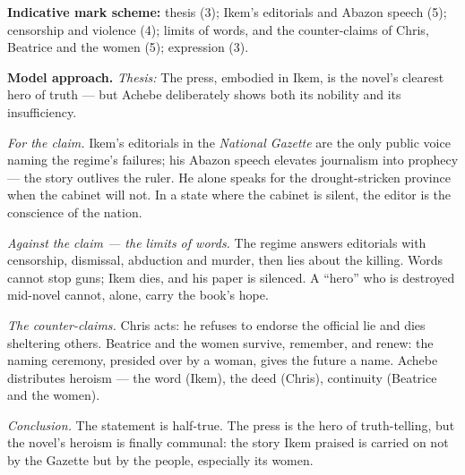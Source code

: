 \documentclass[11pt]{article}
\begin{document}
\begin{corrige}
\textbf{Indicative mark scheme:} thesis (3); Ikem's editorials and Abazon speech (5); censorship and violence (4); limits of words, and the counter-claims of Chris, Beatrice and the women (5); expression (3).

\textbf{Model approach.}
\emph{Thesis:} The press, embodied in Ikem, is the novel's clearest hero of truth --- but Achebe deliberately shows both its nobility and its insufficiency.

\emph{For the claim.} Ikem's editorials in the \emph{National Gazette} are the only public voice naming the regime's failures; his Abazon speech elevates journalism into prophecy --- the story outlives the ruler. He alone speaks for the drought-stricken province when the cabinet will not. In a state where the cabinet is silent, the editor is the conscience of the nation.

\emph{Against the claim --- the limits of words.} The regime answers editorials with censorship, dismissal, abduction and murder, then lies about the killing. Words cannot stop guns; Ikem dies, and his paper is silenced. A ``hero'' who is destroyed mid-novel cannot, alone, carry the book's hope.

\emph{The counter-claims.} Chris acts: he refuses to endorse the official lie and dies sheltering others. Beatrice and the women survive, remember, and renew: the naming ceremony, presided over by a woman, gives the future a name. Achebe distributes heroism --- the word (Ikem), the deed (Chris), continuity (Beatrice and the women).

\emph{Conclusion.} The statement is half-true. The press is the hero of truth-telling, but the novel's heroism is finally communal: the story Ikem praised is carried on not by the Gazette but by the people, especially its women.
\end{corrige}
\end{document}
